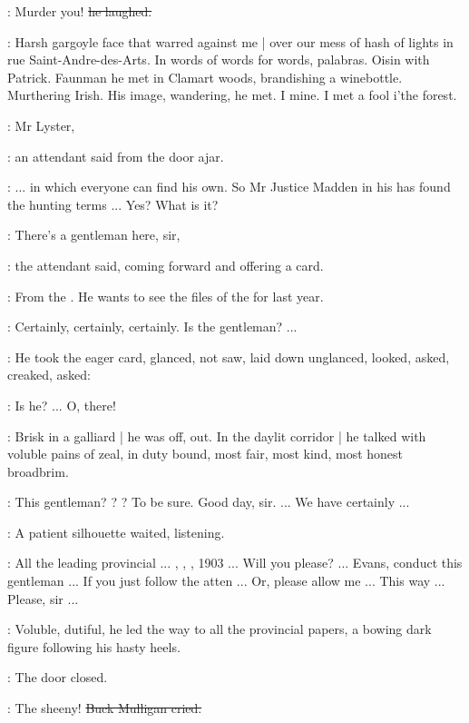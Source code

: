 \mulligan:
Murder you!
\sout{he laughed.}

\StephenInt:
Harsh gargoyle face that warred against me |
over our mess of hash of lights in rue Saint-Andre-des-Arts.
In words of words for words,
palabras.
Oisin with Patrick.
Faunman he met in Clamart woods,
brandishing a winebottle.
Murthering Irish.
His image,
wandering,
he met.
I mine.
I met a fool i'the forest.

\attendant:
Mr Lyster,

:
an attendant said from the door ajar.

\librarian:
... in which everyone can find his own.
So Mr Justice Madden in his 
has found the hunting terms ...
Yes?
What is it?

\attendant:
There's a gentleman here,
sir,

:
the attendant said,
coming forward and offering a card.

\attendant:
From the .
He wants to see the files of the  for last year.

\librarian:
Certainly,
certainly,
certainly.
Is the gentleman? ...

:
He took the eager card,
glanced,
not saw,
laid down unglanced,
looked,
asked,
creaked,
asked:

\librarian:
Is he? ...
O, there!

:
Brisk in a galliard |
he was off, out.
In the daylit corridor |
he talked with voluble pains of zeal,
in duty bound,
most fair,
most kind,
most honest broadbrim.

\librarian:
This gentleman?
?
?
To be sure.
Good day,
sir.
 ...
We have certainly ...

:
A patient silhouette waited,
listening.

\librarian:
All the leading provincial ...
,
,
,
1903 ...
Will you please? ...
Evans,
conduct this gentleman ...
If you just follow the atten ...
Or, please allow me ...
This way ...
Please, sir ...

:
Voluble, dutiful,
he led the way to all the provincial papers,
a bowing dark figure following his hasty heels.

:
The door closed.

\mulligan:
The sheeny!
\sout{Buck Mulligan cried.}

